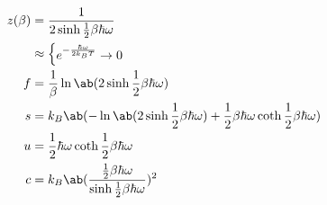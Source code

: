 \documentclass[uplatex,diffipdfmx,a4paper,11pt]{jlreq}
\theoremstyle{definition}
\begin{document}
\begin{theorem}
  \begin{align}
    z(\beta) & = \frac{1}{2\sinh \frac{1}{2}\beta\hbar\omega}                                                                     \\
             & \approx \begin{dcases}
                         e^{-\frac{\hbar\omega}{2k_BT}} \to 0 \\
                       \end{dcases}                                                                       \\
    f        & = \frac{1}{\beta}\ln\ab(2\sinh \frac{1}{2}\beta\hbar\omega)                                                        \\
    s        & = k_B\ab(-\ln\ab(2\sinh\frac{1}{2}\beta\hbar\omega) + \frac{1}{2}\beta\hbar\omega\coth\frac{1}{2}\beta\hbar\omega) \\
    u        & = \frac{1}{2}\hbar\omega\coth\frac{1}{2}\beta\hbar\omega                                                           \\
    c        & = k_B\ab(\frac{\frac{1}{2}\beta\hbar\omega}{\sinh\frac{1}{2}\beta\hbar\omega})^2
  \end{align}
\end{theorem}
\end{document}
